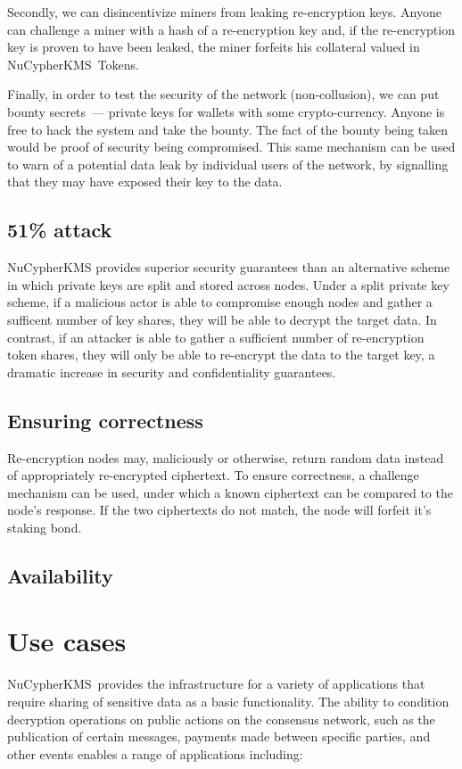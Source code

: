 \documentclass[notitlepage,longbibliography]{revtex4-1}
\newcommand{\kms}{NuCypherKMS}
\begin{document}
Secondly, we can disincentivize miners from leaking re-encryption keys.
Anyone can challenge a miner with a hash of a re-encryption key and, if the re-encryption key is proven to have been leaked, the miner forfeits his collateral valued in \kms~Tokens.

Finally, in order to test the security of the network (non-collusion), we can put bounty secrets~--- private keys for wallets with
some crypto-currency.
Anyone is free to hack the system and take the bounty.
The fact of the bounty being taken would be proof of security being compromised.
This same mechanism can be used to warn of a potential data leak by individual users of the network, by signalling that they may have exposed
their key to the data.

\subsection{51\% attack}
NuCypherKMS provides superior security guarantees than an alternative scheme in which private keys are split and stored across nodes.
Under a split private key scheme, if a malicious actor is able to compromise enough nodes and gather a sufficent number of key shares, they
will be able to decrypt the target data.
In contrast, if an attacker is able to gather a sufficient number of re-encryption token shares, they will only be able to re-encrypt the data
to the target key, a dramatic increase in security and confidentiality guarantees.

\subsection{Ensuring correctness}
Re-encryption nodes may, maliciously or otherwise, return random data instead of appropriately re-encrypted ciphertext. To ensure correctness,
a challenge mechanism can be used, under which a known ciphertext can be compared to the node's response. If the two ciphertexts do not match,
the node will forfeit it's staking bond.

\subsection{Availability}

\section{Use cases}
\kms~provides the infrastructure for a variety of applications that require sharing of sensitive data as a basic
functionality. The ability to condition decryption operations on public actions on the consensus network, such as the publication
of certain messages, payments made between specific parties, and other events enables a range of applications including:
\end{document}
